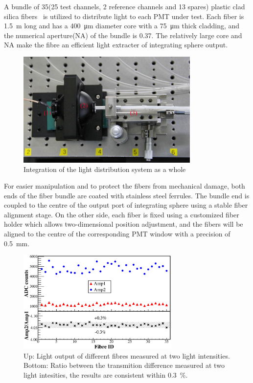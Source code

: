 \documentclass[5p, times]{elsarticle}
\begin{document}
A bundle of 35(25 test channels, 2 reference channels and 13 spares) plastic clad silica fibers~\cite{optical_fibre} is utilized to distribute light to each PMT under test.
Each fiber is \SI{1.5}{\meter} long and has a \SI{400}{\micro\meter} diameter core with a \SI{75}{\micro\meter} thick cladding, and the numerical aperture(NA) of the bundle is 0.37.
The relatively large core and NA make the fibre an efficient light extracter of integrating sphere output. 

\begin{figure}
 \centering
 \includegraphics[width=90mm]{light_dist_label}
\caption{Integration of the light distribution system as a whole}
\label{fig:light_source}
\end{figure} 

For easier manipulation and to protect the fibers from mechanical damage, both ends of the fiber bundle are coated with stainless steel ferrules.
The bundle end is coupled to the centre of the output port of integrating sphere using a stable fiber alignment stage.
On the other side, each fiber is fixed using a customized fiber holder which allows two-dimensional position adjustment, and the fibers will be aligned to the centre of the corresponding PMT window with a precision of \SI{0.5}{\milli\meter}.

\begin{figure}
 \centering
 \includegraphics[width=80mm]{fibre_diff}
\caption{Up: Light output of different fibres measured at two light intensities.
Bottom: Ratio between the transmition difference measured at two light intesities, the results are consistent within \textpm\SI{0.3}{\percent}.}
\label{fig:fibre_diff}
\end{figure} 
\end{document}
